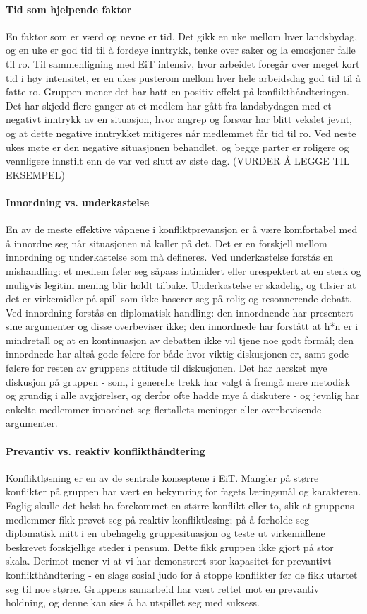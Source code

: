 \paragraph{Tid som hjelpende faktor}
En faktor som er værd og nevne er tid. Det gikk en uke mellom hver landsbydag, og en uke er god tid til å fordøye inntrykk, tenke over saker og la emosjoner falle til ro. Til sammenligning med EiT intensiv, hvor arbeidet foregår over meget kort tid i høy intensitet, er en ukes pusterom mellom hver hele arbeidsdag god tid til å fatte ro. Gruppen mener det har hatt en positiv effekt på konflikthåndteringen. Det har skjedd flere ganger at et medlem har gått fra landsbydagen med et negativt inntrykk av en situasjon, hvor angrep og forsvar har blitt vekslet jevnt, og at dette negative inntrykket mitigeres når medlemmet får tid til ro. Ved neste ukes møte er den negative situasjonen behandlet, og begge parter er roligere og vennligere innstilt enn de var ved slutt av siste dag. (VURDER Å LEGGE TIL EKSEMPEL)

\paragraph{Innordning vs. underkastelse}
En av de meste effektive våpnene i konfliktprevansjon er å være komfortabel med å innordne seg når situasjonen nå kaller på det. Det er en forskjell mellom innordning og underkastelse som må defineres. Ved underkastelse forstås en mishandling: et medlem føler seg såpass intimidert eller urespektert at en sterk og muligvis legitim mening blir holdt tilbake. Underkastelse er skadelig, og tilsier at det er virkemidler på spill som ikke baserer seg på rolig og resonnerende debatt. Ved innordning forstås en diplomatisk handling: den innordnende har presentert sine argumenter og disse overbeviser ikke; den innordnede har forstått at h*n er i mindretall og at en kontinuasjon av debatten ikke vil tjene noe godt formål; den innordnede har altså gode følere for både hvor viktig diskusjonen er, samt gode følere for resten av gruppens attitude til diskusjonen. Det har hersket mye diskusjon på gruppen - som, i generelle trekk har valgt å fremgå mere metodisk og grundig i alle avgjørelser, og derfor ofte hadde mye å diskutere - og jevnlig har enkelte medlemmer innordnet seg flertallets meninger eller overbevisende argumenter. 

\paragraph{Prevantiv vs. reaktiv konflikthåndtering}
Konfliktløsning er en av de sentrale konseptene i EiT. Mangler på større konflikter på gruppen har vært en bekymring for fagets læringsmål og karakteren. Faglig skulle det helst ha forekommet en større konflikt eller to, slik at gruppens medlemmer fikk prøvet seg på reaktiv konfliktløsing; på å forholde seg diplomatisk mitt i en ubehagelig gruppesituasjon og teste ut virkemidlene beskrevet forskjellige steder i pensum. 
Dette fikk gruppen ikke gjort på stor skala. Derimot mener vi at vi har demonstrert stor kapasitet for prevantivt konflikthåndtering - en slags sosial judo for å stoppe konflikter før de fikk utartet seg til noe større. Gruppens samarbeid har vært rettet mot en prevantiv holdning, og denne kan sies å ha utspillet seg med suksess. 
